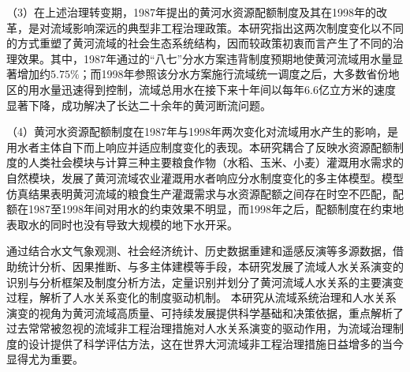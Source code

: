 \begin{cabstract}
（3）在上述治理转变期，1987年提出的黄河水资源配额制度及其在1998年的改革，是对流域影响深远的典型非工程治理政策。本研究指出这两次制度变化以不同的方式重塑了黄河流域的社会\textendash{}生态系统结构，因而较政策初衷而言产生了不同的治理效果。其中，1987年通过的``八七''分水方案违背制度预期地使黄河流域用水量显著增加约$5.75\%$；而1998年参照该分水方案施行流域统一调度之后，大多数省份地区的用水量迅速得到控制，流域总用水在接下来十年间以每年6.6亿立方米的速度显著下降，成功解决了长达二十余年的黄河断流问题。

（4）黄河水资源配额制度在1987年与1998年两次变化对流域用水产生的影响，是用水者主体自下而上响应并适应制度变化的表现。本研究耦合了反映水资源配额制度的人类社会模块与计算三种主要粮食作物（水稻、玉米、小麦）灌溉用水需求的自然模块，发展了黄河流域农业灌溉用水者响应分水制度变化的多主体模型。模型仿真结果表明黄河流域的粮食生产灌溉需求与水资源配额之间存在时空不匹配，配额在1987至1998年间对用水的约束效果不明显，而1998年之后，配额制度在约束地表取水的同时也没有导致大规模的地下水开采。

通过结合水文气象观测、社会经济统计、历史数据重建和遥感反演等多源数据，借助统计分析、因果推断、与多主体建模等手段，本研究发展了流域人\textendash{}水关系演变的识别与分析框架及制度分析方法，定量识别并划分了黄河流域人\textendash{}水关系的主要演变过程，解析了人\textendash{}水关系变化的制度驱动机制。
本研究从流域系统治理和人\textendash{}水关系演变的视角为黄河流域高质量、可持续发展提供科学基础和决策依据，重点解析了过去常常被忽视的流域非工程治理措施对人\textendash{}水关系演变的驱动作用，为流域治理制度的设计提供了科学评估方法，这在世界大河流域非工程治理措施日益增多的当今显得尤为重要。


\end{cabstract}




